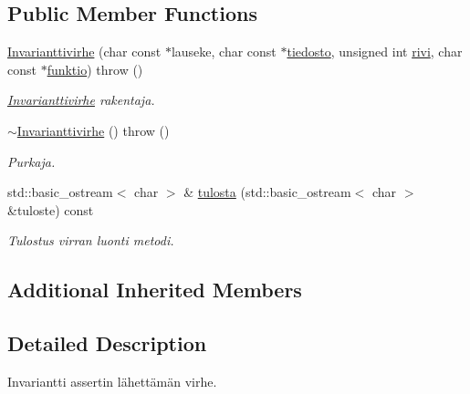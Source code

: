 \subsection*{Public Member Functions}
\begin{DoxyCompactItemize}
\item 
\hyperlink{class_julkinen_1_1_invarianttivirhe_a946670cc26aff5883b3dd4edb2e8e988}{Invarianttivirhe} (char const $\ast$lauseke, char const $\ast$\hyperlink{class_julkinen_1_1_vaittamavirhe_a8624cd880b8466188ef6de480431dffb}{tiedosto}, unsigned int \hyperlink{class_julkinen_1_1_vaittamavirhe_abc571141231b3fa789ae41d2d80642ef}{rivi}, char const $\ast$\hyperlink{class_julkinen_1_1_vaittamavirhe_afd5de6b5639336288d28fd077c84a20c}{funktio})  throw ()
\begin{DoxyCompactList}\small\item\em \hyperlink{class_julkinen_1_1_invarianttivirhe}{Invarianttivirhe} rakentaja. \end{DoxyCompactList}\item 
\hypertarget{class_julkinen_1_1_invarianttivirhe_a34c1aa9b2cbd4e58adfb3646d86eb7c0}{}\hyperlink{class_julkinen_1_1_invarianttivirhe_a34c1aa9b2cbd4e58adfb3646d86eb7c0}{$\sim$\+Invarianttivirhe} ()  throw ()\label{class_julkinen_1_1_invarianttivirhe_a34c1aa9b2cbd4e58adfb3646d86eb7c0}

\begin{DoxyCompactList}\small\item\em Purkaja. \end{DoxyCompactList}\item 
std\+::basic\+\_\+ostream$<$ char $>$ \& \hyperlink{class_julkinen_1_1_invarianttivirhe_ac0f90f4d0915c90c14d752a64da5196a}{tulosta} (std\+::basic\+\_\+ostream$<$ char $>$ \&tuloste) const 
\begin{DoxyCompactList}\small\item\em Tulostus virran luonti metodi. \end{DoxyCompactList}\end{DoxyCompactItemize}
\subsection*{Additional Inherited Members}


\subsection{Detailed Description}
Invariantti assertin lähettämän virhe. 

